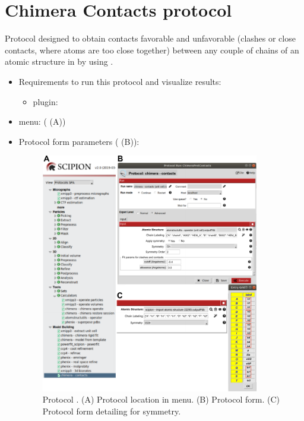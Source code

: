 \section{Chimera Contacts protocol}
\label{app:chimeraContactsProtocol}%

Protocol designed to obtain contacts favorable and unfavorable (clashes or close contacts, where atoms are too close together) between any couple of chains of an atomic structure in \scipion by using \chimera. 

 \begin{itemize}
  \item Requirements to run this protocol and visualize results:
    \begin{itemize}
        \item \scipion plugin: 
    \end{itemize}
  \item \scipion menu:
    ( (A))
  
  \item Protocol form parameters ( (B)):
  
  \begin{figure}[H]
     \centering 
     \captionsetup{width=.7\linewidth} 
     \includegraphics[width=0.90\textwidth]{Images_appendix/Fig155.pdf}
     \caption{Protocol . (A) Protocol location in \scipion menu. (B) Protocol form. (C) Protocol form detailing  for  symmetry.}
     \label{fig:app_protocol_contacts_1}
    \end{figure}


\end{itemize}
